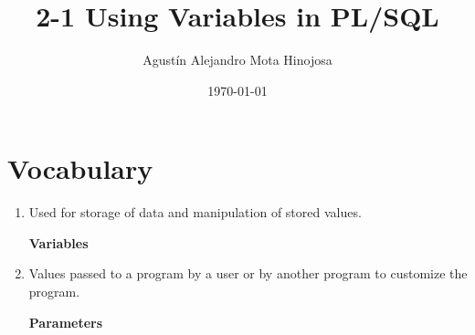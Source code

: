 \documentclass[11pt]{article}
\author{Agustín Alejandro Mota Hinojosa}
\date{\today}
\title{2-1 Using Variables in PL/SQL}
\begin{document}
\maketitle
\tableofcontents

\section{Vocabulary}
\label{sec:org8265613}
\begin{enumerate}
\item Used for storage of data and manipulation of stored values.

\textbf{Variables}

\item Values passed to a program by a user or by another program to customize
the program.

\textbf{Parameters}
\end{enumerate}
\end{document}
